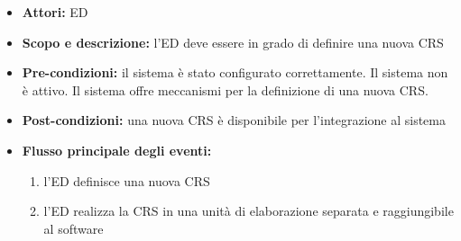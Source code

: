 \begin{itemize}
	\item \textbf{Attori:} ED
	\item \textbf{Scopo e descrizione:} l'ED deve essere in grado di definire una nuova CRS
	\item \textbf{Pre-condizioni:} il sistema è stato configurato correttamente. Il sistema non è attivo. Il sistema offre meccanismi per la definizione di una nuova CRS.
	\item \textbf{Post-condizioni:} una nuova CRS è disponibile per l'integrazione al sistema
	\item \textbf{Flusso principale degli eventi:}
		\begin{enumerate}
			\item l'ED definisce una nuova CRS
			\item l'ED realizza la CRS in una unità di elaborazione separata e raggiungibile al software
		\end{enumerate}
	
\end{itemize}

